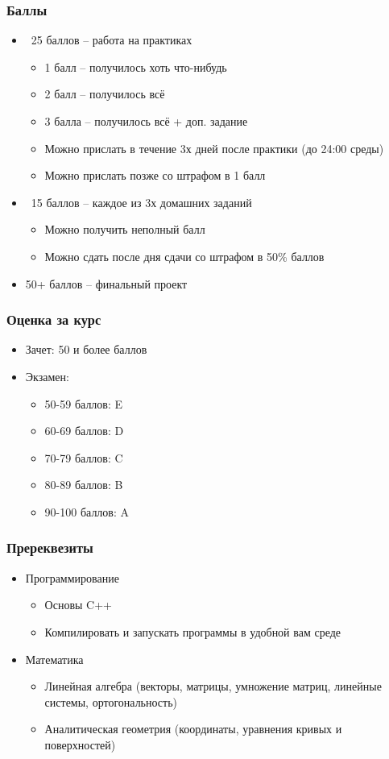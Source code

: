 \documentclass{beamer}
\begin{document}
\begin{frame}
\frametitle{Баллы}
\begin{itemize}
\pause
\item ~25 баллов -- работа на практиках
\pause
\begin{itemize}
\item 1 балл -- получилось хоть что-нибудь
\item 2 балл -- получилось всё
\item 3 балла -- получилось всё + доп. задание
\pause
\item Можно прислать в течение 3х дней после практики (до 24:00 среды)
\pause
\item Можно прислать позже со штрафом в 1 балл
\end{itemize}
\pause
\item ~15 баллов -- каждое из 3х домашних заданий
\pause
\begin{itemize}
\item Можно получить неполный балл
\pause
\item Можно сдать после дня сдачи со штрафом в 50\% баллов
\end{itemize}
\pause
\item 50+ баллов -- финальный проект
\end{itemize}
\end{frame}

\begin{frame}
\frametitle{Оценка за курс}
\pause
\begin{itemize}
\item Зачет: 50 и более баллов
\pause
\item Экзамен:
\begin{itemize}
\item 50-59 баллов: E
\item 60-69 баллов: D
\item 70-79 баллов: C
\item 80-89 баллов: B
\item 90-100 баллов: A
\end{itemize}
\end{itemize}
\end{frame}

\begin{frame}
\frametitle{Пререквезиты}
\pause
\begin{itemize}
\item Программирование
\pause
\begin{itemize}
\item Основы C++
\pause
\item Компилировать и запускать программы в удобной вам среде
\end{itemize}
\pause
\item Математика
\pause
\begin{itemize}
\item Линейная алгебра (векторы, матрицы, умножение матриц, линейные системы, ортогональность)
\pause
\item Аналитическая геометрия (координаты, уравнения кривых и поверхностей)
\end{itemize}
\end{itemize}
\end{frame}
\end{document}
